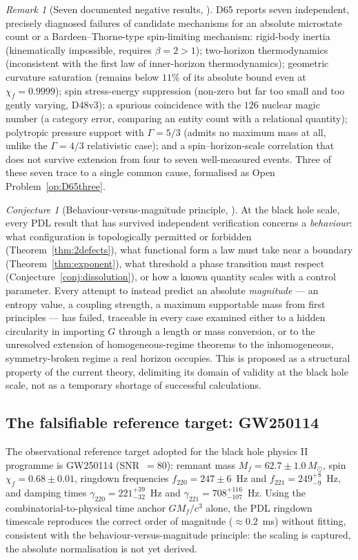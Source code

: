\documentclass[11pt,a4paper]{article}
\theoremstyle{plain}
\theoremstyle{definition}
\theoremstyle{remark}
\newtheorem{remark}[theorem]{Remark}
\newtheorem{conjecture}[theorem]{Conjecture}
\begin{document}
\begin{remark}[Seven documented negative results, \cite{D65}]
\label{rem:sevenneg}
D65 reports seven independent, precisely diagnosed failures of candidate mechanisms for an absolute microstate count or a Bardeen--Thorne-type spin-limiting mechanism: rigid-body inertia (kinematically impossible, requires $\beta=2>1$); two-horizon thermodynamics (inconsistent with the first law of inner-horizon thermodynamics); geometric curvature saturation (remains below $11\%$ of its absolute bound even at $\chi_f=0.9999$); spin stress-energy suppression (non-zero but far too small and too gently varying, D48v3); a spurious coincidence with the $126$ nuclear magic number (a category error, comparing an entity count with a relational quantity); polytropic pressure support with $\Gamma=5/3$ (admits no maximum mass at all, unlike the $\Gamma=4/3$ relativistic case); and a spin--horizon-scale correlation that does not survive extension from four to seven well-measured events. Three of these seven trace to a single common cause, formalised as Open Problem~\ref{op:D65three}.
\end{remark}

\begin{conjecture}[Behaviour-versus-magnitude principle, \cite{D65}]
\label{conj:behaviourmagnitude}
At the black hole scale, every PDL result that has survived independent verification concerns a \emph{behaviour}: what configuration is topologically permitted or forbidden (Theorem~\ref{thm:2defects}), what functional form a law must take near a boundary (Theorem~\ref{thm:exponent}), what threshold a phase transition must respect (Conjecture~\ref{conj:dissolution}), or how a known quantity scales with a control parameter. Every attempt to instead predict an absolute \emph{magnitude} --- an entropy value, a coupling strength, a maximum supportable mass from first principles --- has failed, traceable in every case examined either to a hidden circularity in importing $G$ through a length or mass conversion, or to the unresolved extension of homogeneous-regime theorems to the inhomogeneous, symmetry-broken regime a real horizon occupies. This is proposed as a structural property of the current theory, delimiting its domain of validity at the black hole scale, not as a temporary shortage of successful calculations.
\end{conjecture}

\subsection{The falsifiable reference target: GW250114}
\label{subsec:GW250114}
The observational reference target adopted for the black hole physics II programme is GW250114 (SNR~$=80$): remnant mass $M_f=62.7\pm1.0\,M_\odot$, spin $\chi_f=0.68\pm0.01$, ringdown frequencies $f_{220}=247\pm6$~Hz and $f_{221}=249^{+8}_{-9}$~Hz, and damping times $\gamma_{220}=221^{+39}_{-32}$~Hz and $\gamma_{221}=708^{+116}_{-107}$~Hz. Using the combinatorial-to-physical time anchor $GM_f/c^3$ alone, the PDL ringdown timescale reproduces the correct order of magnitude ($\approx0.2$~ms) without fitting, consistent with the behaviour-versus-magnitude principle: the scaling is captured, the absolute normalisation is not yet derived.
\end{document}

